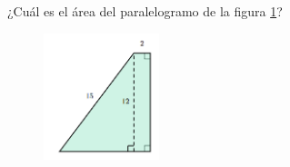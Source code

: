 \question[15]  ¿Cuál es el \'area del paralelogramo de la figura \ref{fig:area_compuesta_03}?
\begin{figure}[H]
    \begin{center}
        \includegraphics[width=0.3\textwidth]{../images/area_compuesta_03.png}
    \end{center}
    \caption{}
    \label{fig:area_compuesta_03}
\end{figure}